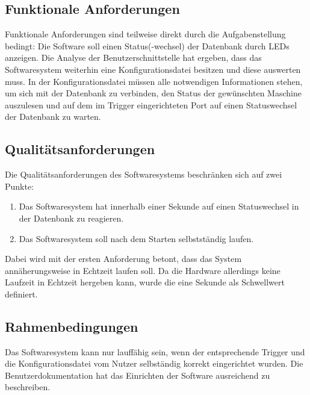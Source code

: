 \documentclass{scrartcl}
\begin{document}
\subsection{Funktionale Anforderungen}
Funktionale Anforderungen sind teilweise direkt durch die Aufgabenstellung bedingt: Die Software soll einen Status(-wechsel) der Datenbank durch LEDs anzeigen. Die Analyse der Benutzerschnittstelle hat ergeben, dass das Softwaresystem weiterhin eine Konfigurationsdatei besitzen und diese auswerten muss. In der Konfigurationsdatei müssen alle notwendigen Informationen stehen, um sich mit der Datenbank zu verbinden, den Status der gewünschten Maschine auszulesen und auf dem im Trigger eingerichteten Port auf einen Statuswechsel der Datenbank zu warten.

\subsection{Qualitätsanforderungen}
Die Qualitätsanforderungen des Softwaresystems beschränken sich auf zwei Punkte:
\begin{enumerate}
	\item Das Softwaresystem hat innerhalb einer Sekunde auf einen Statuswechsel in der Datenbank zu reagieren.
	\item Das Softwaresystem soll nach dem Starten selbstständig laufen.
\end{enumerate}
Dabei wird mit der ersten Anforderung betont, dass das System annäherungsweise in Echtzeit laufen soll. Da die Hardware allerdings keine Laufzeit in Echtzeit hergeben kann, wurde die eine Sekunde als Schwellwert definiert.

\subsection{Rahmenbedingungen}
Das Softwaresystem kann nur lauffähig sein, wenn der entsprechende Trigger und die Konfigurationsdatei vom Nutzer selbständig korrekt eingerichtet wurden. Die Benutzerdokumentation hat das Einrichten der Software ausreichend zu beschreiben.
\end{document}
